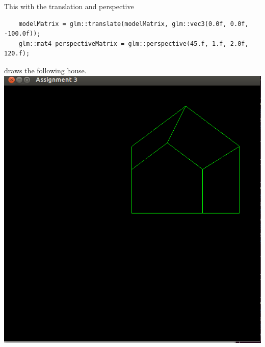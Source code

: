 \documentclass{article}
\begin{document}
This with the translation and perspective 
\begin{verbatim}
	modelMatrix = glm::translate(modelMatrix, glm::vec3(0.0f, 0.0f, -100.0f));	
	glm::mat4 perspectiveMatrix = glm::perspective(45.f, 1.f, 2.0f, 120.f);
\end{verbatim}
draws the following house.\\
\includegraphics[scale=0.4]{penis1.png}\\
\end{document}
